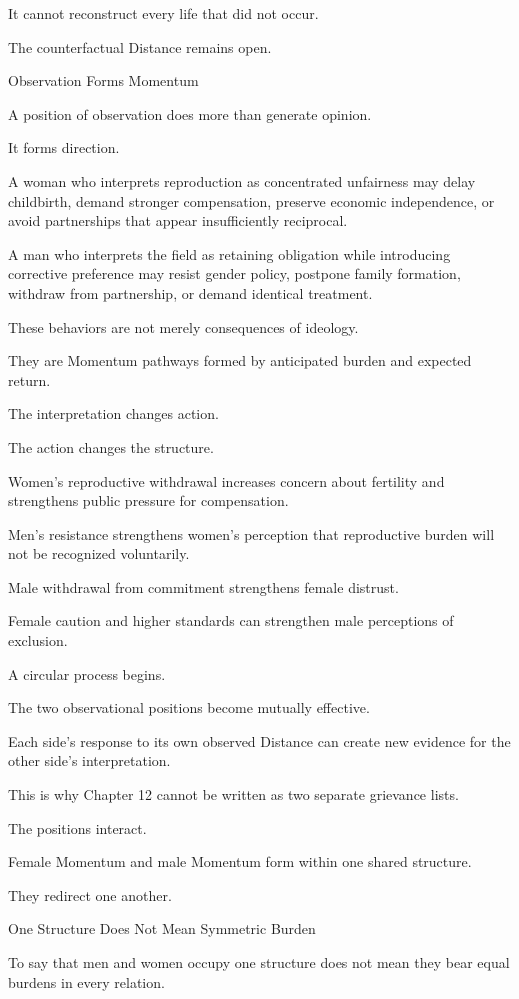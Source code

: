 It cannot reconstruct every life that did not occur.

The counterfactual Distance remains open.

Observation Forms Momentum

A position of observation does more than generate opinion.

It forms direction.

A woman who interprets reproduction as concentrated unfairness may delay childbirth, demand stronger compensation, preserve economic independence, or avoid partnerships that appear insufficiently reciprocal.

A man who interprets the field as retaining obligation while introducing corrective preference may resist gender policy, postpone family formation, withdraw from partnership, or demand identical treatment.

These behaviors are not merely consequences of ideology.

They are Momentum pathways formed by anticipated burden and expected return.

The interpretation changes action.

The action changes the structure.

Women’s reproductive withdrawal increases concern about fertility and strengthens public pressure for compensation.

Men’s resistance strengthens women’s perception that reproductive burden will not be recognized voluntarily.

Male withdrawal from commitment strengthens female distrust.

Female caution and higher standards can strengthen male perceptions of exclusion.

A circular process begins.

The two observational positions become mutually effective.

Each side’s response to its own observed Distance can create new evidence for the other side’s interpretation.

This is why Chapter 12 cannot be written as two separate grievance lists.

The positions interact.

Female Momentum and male Momentum form within one shared structure.

They redirect one another.

One Structure Does Not Mean Symmetric Burden

To say that men and women occupy one structure does not mean they bear equal burdens in every relation.

